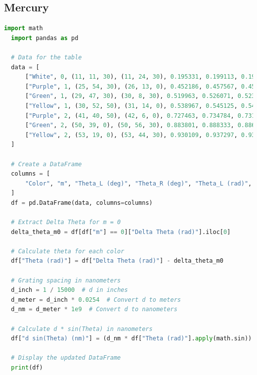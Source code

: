 \documentclass[a4paper,11pt]{article}
\begin{document}
\subsection*{Mercury}
\begin{lstlisting}[language=Python]
  import math
  import pandas as pd
  
  # Data for the table
  data = [
      ["White", 0, (11, 11, 30), (11, 24, 30), 0.195331, 0.199113, 0.197222],
      ["Purple", 1, (25, 54, 30), (26, 13, 0), 0.452186, 0.457567, 0.454877],
      ["Green", 1, (29, 47, 30), (30, 8, 30), 0.519963, 0.526071, 0.523017],
      ["Yellow", 1, (30, 52, 50), (31, 14, 0), 0.538967, 0.545125, 0.542046],
      ["Purple", 2, (41, 40, 50), (42, 6, 0), 0.727463, 0.734784, 0.731124],
      ["Green", 2, (50, 39, 0), (50, 56, 30), 0.883801, 0.888333, 0.886067],
      ["Yellow", 2, (53, 19, 0), (53, 44, 30), 0.930109, 0.937297, 0.933703],
  ]
  
  # Create a DataFrame
  columns = [
      "Color", "m", "Theta_L (deg)", "Theta_R (deg)", "Theta_L (rad)", "Theta_R (rad)", "Delta Theta (rad)"
  ]
  df = pd.DataFrame(data, columns=columns)
  
  # Extract Delta Theta for m = 0
  delta_theta_m0 = df[df["m"] == 0]["Delta Theta (rad)"].iloc[0]
  
  # Calculate theta for each color
  df["Theta (rad)"] = df["Delta Theta (rad)"] - delta_theta_m0
  
  # Grating spacing in nanometers
  d_inch = 1 / 15000  # d in inches
  d_meter = d_inch * 0.0254  # Convert d to meters
  d_nm = d_meter * 1e9  # Convert d to nanometers
  
  # Calculate d * sin(Theta) in nanometers
  df["d sin(Theta) (nm)"] = (d_nm * df["Theta (rad)"].apply(math.sin)).round(4)
  
  # Display the updated DataFrame
  print(df)
\end{lstlisting}
\newpage
\end{document}
